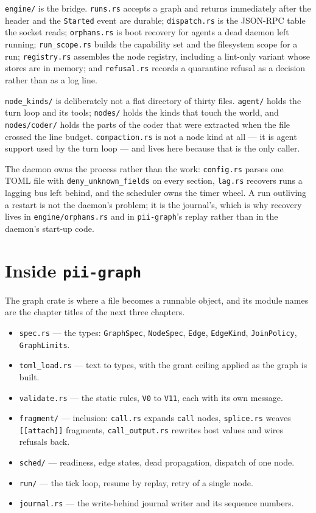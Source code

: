 \texttt{engine/} is the bridge. \texttt{runs.rs} accepts a graph and returns immediately after the
header and the \texttt{Started} event are durable; \texttt{dispatch.rs} is the JSON-RPC table the
socket reads; \texttt{orphans.rs} is boot recovery for agents a dead daemon left running;
\texttt{run\_scope.rs} builds the capability set and the filesystem scope for a run;
\texttt{registry.rs} assembles the node registry, including a lint-only variant whose stores are in
memory; and \texttt{refusal.rs} records a quarantine refusal as a decision rather than as a log
line.

\texttt{node\_kinds/} is deliberately not a flat directory of thirty files. \texttt{agent/} holds
the turn loop and its tools; \texttt{nodes/} holds the kinds that touch the world, and
\texttt{nodes/coder/} holds the parts of the coder that were extracted when the file crossed the
line budget. \texttt{compaction.rs} is not a node kind at all --- it is agent support used by the
turn loop --- and lives here because that is the only caller.

The daemon owns the process rather than the work: \texttt{config.rs} parses one TOML file with
\texttt{deny\_unknown\_fields} on every section, \texttt{lag.rs} recovers runs a lagging bus left
behind, and the scheduler owns the timer wheel. A run outliving a restart is not the daemon's
problem; it is the journal's, which is why recovery lives in \texttt{engine/orphans.rs} and in
\texttt{pii-graph}'s replay rather than in the daemon's start-up code.

\section{Inside \texttt{pii-graph}}

The graph crate is where a file becomes a runnable object, and its module names are the chapter
titles of the next three chapters.

\begin{itemize}
	\item \texttt{spec.rs} --- the types: \texttt{GraphSpec}, \texttt{NodeSpec}, \texttt{Edge},
	\texttt{EdgeKind}, \texttt{JoinPolicy}, \texttt{GraphLimits}.
	\item \texttt{toml\_load.rs} --- text to types, with the grant ceiling applied as the graph is
	built.
	\item \texttt{validate.rs} --- the static rules, \texttt{V0} to \texttt{V11}, each with its own
	message.
	\item \texttt{fragment/} --- inclusion: \texttt{call.rs} expands \texttt{call} nodes,
	\texttt{splice.rs} weaves \texttt{[[attach]]} fragments, \texttt{call\_output.rs} rewrites host
	values and wires refusals back.
	\item \texttt{sched/} --- readiness, edge states, dead propagation, dispatch of one node.
	\item \texttt{run/} --- the tick loop, resume by replay, retry of a single node.
	\item \texttt{journal.rs} --- the write-behind journal writer and its sequence numbers.
\end{itemize}

